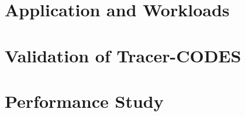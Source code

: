 

\section{Application and Workloads}


\section{Validation of Tracer-CODES}


\section{Performance Study}


